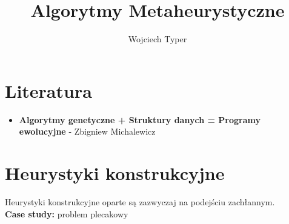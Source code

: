 \documentclass{article}
\title{Algorytmy Metaheurystyczne}
\author{Wojciech Typer}
\date{}
\begin{document}
\maketitle

\section*{Literatura}
\begin{itemize}
    \item \textbf{Algorytmy genetyczne + Struktury danych = Programy ewolucyjne} - Zbigniew Michalewicz
\end{itemize}   

\section*{Heurystyki konstrukcyjne}
Heurystyki konstrukcyjne oparte są zazwyczaj na podejściu zachłannym. \\
\textbf{Case study: } problem plecakowy
\end{document}
